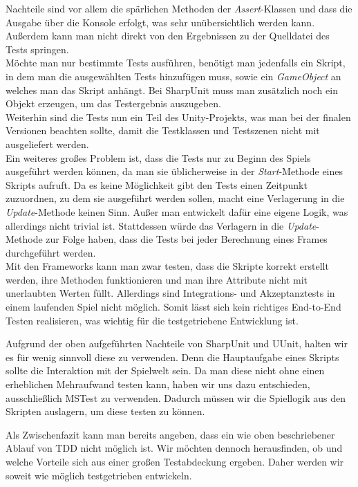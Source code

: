 Nachteile sind vor allem die spärlichen Methoden der \textit{Assert}-Klassen und dass die Ausgabe über die Konsole erfolgt, was sehr unübersichtlich werden kann. Außerdem kann man nicht direkt von den Ergebnissen zu der Quelldatei des Tests springen.\\
Möchte man nur bestimmte Tests ausführen, benötigt man jedenfalls ein Skript, in dem man die ausgewählten Tests hinzufügen muss, sowie ein \textit{GameObject} an welches man das Skript anhängt. Bei SharpUnit muss man zusätzlich noch ein Objekt erzeugen, um das Testergebnis auszugeben.\\
Weiterhin sind die Tests nun ein Teil des Unity-Projekts, was man bei der finalen Versionen beachten sollte, damit die Testklassen und Testszenen nicht mit ausgeliefert werden.\\
Ein weiteres großes Problem ist, dass die Tests nur zu Beginn des Spiels ausgeführt werden können, da man sie üblicherweise in der \textit{Start}-Methode eines Skripts aufruft. Da es keine Möglichkeit gibt den Tests einen Zeitpunkt zuzuordnen, zu dem sie ausgeführt werden sollen, macht eine Verlagerung in die \textit{Update}-Methode keinen Sinn. Außer man entwickelt dafür eine eigene Logik, was allerdings nicht trivial ist. Stattdessen würde das Verlagern in die \textit{Update}-Methode zur Folge haben, dass die Tests bei jeder Berechnung eines Frames durchgeführt werden.\\ Mit den Frameworks kann man zwar testen, dass die Skripte korrekt erstellt werden, ihre Methoden funktionieren und man ihre Attribute nicht mit unerlaubten Werten füllt. Allerdings sind Integrations- und Akzeptanztests in einem laufenden Spiel nicht möglich. Somit lässt sich kein richtiges End-to-End Testen realisieren, was wichtig für die testgetriebene Entwicklung ist.

Aufgrund der oben aufgeführten Nachteile von SharpUnit und UUnit, halten wir es für wenig sinnvoll diese zu verwenden. Denn die Hauptaufgabe eines Skripts sollte die Interaktion mit der Spielwelt sein. Da man diese nicht ohne einen erheblichen Mehraufwand testen kann, haben wir uns dazu entschieden, ausschließlich MSTest zu verwenden. Dadurch müssen wir die Spiellogik aus den Skripten auslagern, um diese testen zu können.

Als Zwischenfazit kann man bereits angeben, dass ein wie oben beschriebener Ablauf von TDD nicht möglich ist. Wir möchten dennoch herausfinden, ob und welche Vorteile sich aus einer großen Testabdeckung ergeben. Daher werden wir soweit wie möglich testgetrieben entwickeln.